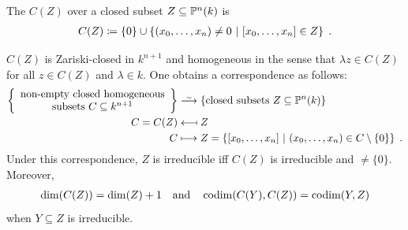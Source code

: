 \documentclass[a4paper,parskip=half,numbers=enddot, DIV=12]{scrreprt}
\begin{document}
\begin{defi}
The  $C(Z)$ over a closed subset $Z\subseteq \mathbb{P}^n(k)$ is \begin{align*}C(Z)\coloneqq\{0\} \cup \left\{(x_0,\ldots,x_n)\neq 0 \ \middle|\ 
[x_0,\ldots,x_n]\in Z\right\}\;.
\end{align*}
\end{defi}
\begin{prop}
$C(Z)$ is Zariski-closed in $k^{n+1}$ and homogeneous in the sense that $\lambda z\in C(Z)$ for all $z\in C(Z)$ and $\lambda\in k$.
One obtains a correspondence as follows:
\begin{align*}
\left\{
\begin{array}{c}
\text{non-empty closed homogeneous}\\
 \text{subsets }C\subseteq k^{n+1}
\end{array}
\right\}&\isomorphism\left\{\text{closed subsets }Z\subseteq \IP^n(k)\right\}\\
C=C(Z)&\longmapsfrom Z\\
C&\longmapsto Z = \left\{[x_0,\ldots,x_n] \st (x_0,\ldots,x_n)\in C\setminus \{0\}\right\}\;.
\end{align*}
Under this correspondence, $Z$ is irreducible iff $C(Z)$ is irreducible and $\neq\{0\}$. Moreover, 
\begin{align*}
	\dim(C(Z)) = \dim(Z)+1\quad\text{and}\quad\operatorname{codim}(C(Y),C(Z)) = \operatorname{codim}(Y,Z)
\end{align*}
 when $Y\subseteq Z$ is irreducible.
\end{prop}
\end{document}
